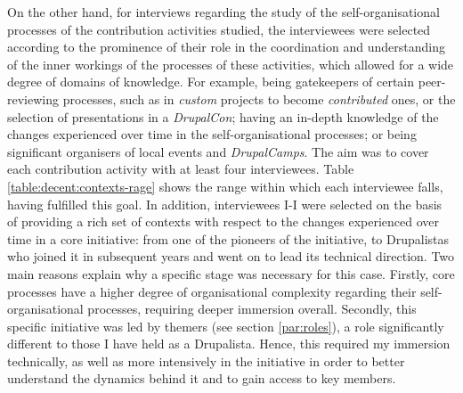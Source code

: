 On the other hand, for interviews regarding the study of the self-organisational processes of the contribution activities studied, the  interviewees were selected according to the prominence of their role in the coordination and understanding of the inner workings of the processes of these activities, which allowed for a wide degree of domains of knowledge. For example, being gatekeepers of certain peer-reviewing processes, such as in \textit{custom} projects to become \textit{contributed} ones, or the selection of presentations in a \textit{DrupalCon}; having an in-depth knowledge of the changes experienced over time in the self-organisational processes; or being significant organisers of local events and \textit{DrupalCamps}. The aim was to cover each contribution activity with at least four interviewees. Table \ref{table:decent:contexts-rage} shows the range within which each interviewee falls, having fulfilled this goal. In addition, interviewees I-I were selected on the basis of providing a rich set of contexts with respect to the changes experienced over time in a core initiative: from one of the pioneers of the initiative, to Drupalistas who joined it in subsequent years and went on to lead its technical direction. Two main reasons explain why a specific stage was necessary for this case. Firstly, core processes have a higher degree of organisational complexity regarding their self-organisational processes, requiring deeper immersion overall. Secondly, this specific initiative was led by themers (see section \ref{par:roles}), a role significantly different to those I have held as a Drupalista. Hence, this required my immersion technically, as well as more intensively in the initiative in order to better understand the dynamics behind it and to gain access to key members.

